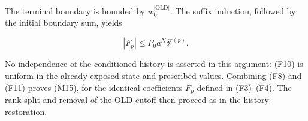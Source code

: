 The terminal boundary is bounded by \(w_0^{|\mathrm{OLD}|}\). The suffix
induction, followed by the initial boundary sum, yields

\[
|F_p|\le P_0 a^N\delta^{r(p)}. \tag{F11}
\]

No independence of the conditioned history is asserted in this argument:
(F10) is uniform in the already exposed state and prescribed values.
Combining (F8) and (F11) proves (M15), for the identical coefficients
\(F_p\) defined in (F3)--(F4). The rank split and removal of the OLD
cutoff then proceed as in
\protect\hyperlink{marked-correlation-restoring-all-histories}{the
history restoration}.
